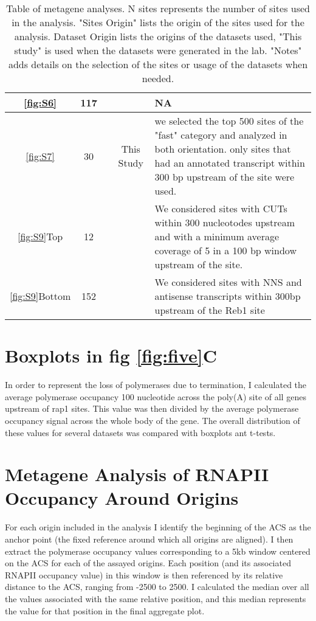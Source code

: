 \begin{sidewaystable}
{\begin{tabular}[hp!]{ccccp{12cm}}
\hline 
\ref{fig:S6} & 117 & \cite{zentner:2015:checseq} & \cite{schaughency:2014:genomewide} & NA \\ 
\hline 
\ref{fig:S7} & 30 & \cite{zentner:2015:checseq} & This Study & we selected the top 500 sites of the "fast" category and analyzed in both orientation. only sites that had an annotated transcript within 300 bp upstream of the site were used.  \\ 
\hline 
\ref{fig:S9}Top & 12 & \cite{kubik:2015:nucleosome} & \cite{schaughency:2014:genomewide} & We considered sites with CUTs within 300 nucleotodes upstream and with a minimum average coverage of 5 in a 100 bp window upstream of the site.  \\ 
\hline 
\ref{fig:S9}Bottom & 152 & \cite{zentner:2015:checseq} & \cite{schaughency:2014:genomewide} & We considered sites with NNS and antisense transcripts within 300bp upstream of the Reb1 site \\ 
\hline 

\end{tabular}}
  \caption{Table of metagene analyses. N sites represents the number of sites used in the analysis. "Sites Origin" lists the origin of the sites used for the analysis. Dataset Origin lists the origins of the datasets used, "This study" is used when the datasets were generated in the lab. "Notes" adds details on the selection of the sites or usage of the datasets when needed.}
  \label{tab:test}
\end{sidewaystable}
\doublespacing

\section*{Boxplots in fig \ref{fig:five}C}

In order to represent the loss of polymerases due to termination, I calculated the average polymerase occupancy 100 nucleotide across the poly(A) site of all genes upstream of rap1 sites. This value was then divided by the average polymerase occupancy signal across the whole body of the gene. The overall distribution of these values for several datasets was compared with boxplots ant t-tests.


\singlespacing
\section*{Metagene Analysis of RNAPII Occupancy Around Origins}
\doublespacing

For each origin included in the analysis I identify the beginning of the ACS as the anchor point (the fixed reference around which all origins are aligned). 
I then extract the polymerase occupancy values corresponding to a 5kb window centered on the ACS for each of the assayed origins. 
Each position (and its associated RNAPII occupancy value) in this window is then referenced by its relative distance to the ACS, ranging from -2500 to 2500. 
I calculated the median over all the values associated with the same relative position, and this median represents the value for that position in the final aggregate plot.

